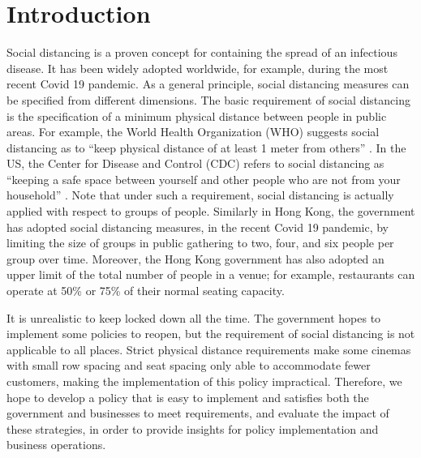 \section{Introduction}

Social distancing is a proven concept for containing the spread of an infectious disease. It has been widely adopted worldwide, for example, during the most recent Covid 19 pandemic. As a general principle, social distancing measures can be specified from different dimensions. The basic requirement of social distancing is the specification of a minimum physical distance between people in public areas. For example, the World Health Organization (WHO) suggests social distancing as to ``keep physical distance of at least 1 meter from others'' \cite{AdviceforPublic}. In the US, the Center for Disease and Control (CDC) refers to social distancing as ``keeping a safe space between yourself and other people who are not from your household'' \cite{CDC}. 
Note that under such a requirement, social distancing is actually applied with respect to groups of people. Similarly in Hong Kong, the government has adopted social distancing measures, in the recent Covid 19 pandemic, by limiting the size of groups in public gathering to two, four, and six people per group over time. Moreover, the Hong Kong government has also adopted an upper limit of the total number of people in a venue; for example, restaurants can operate at 50\% or 75\% of their normal seating capacity. 

It is unrealistic to keep locked down all the time. The government hopes to implement some policies to reopen, but the requirement of social distancing is not applicable to all places. Strict physical distance requirements make some cinemas with small row spacing and seat spacing only able to accommodate fewer customers, making the implementation of this policy impractical. Therefore, we hope to develop a policy that is easy to implement and satisfies both the government and businesses to meet requirements, and evaluate the impact of these strategies, in order to provide insights for policy implementation and business operations.

